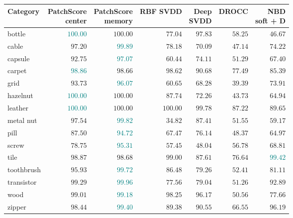 \begin{tabular}{@{}lrrrrrr@{}}
\toprule
\textbf{Category} & \shortstack{PatchScore\\center} & \shortstack{PatchScore\\memory} & RBF SVDD & \shortstack{Deep\\SVDD} & DROCC & \shortstack{NBD\\soft + D}\\
\midrule
bottle & \textcolor{teal}{$100.00$} & $100.00$ & $77.04$ & $97.83$ & $58.25$ & $46.67$\\
cable & $97.20$ & \textcolor{teal}{$99.89$} & $78.18$ & $70.09$ & $47.14$ & $74.22$\\
capsule & $92.75$ & \textcolor{teal}{$97.07$} & $60.44$ & $74.11$ & $51.29$ & $67.40$\\
carpet & \textcolor{teal}{$98.86$} & $98.66$ & $98.62$ & $90.68$ & $77.49$ & $85.39$\\
grid & $93.73$ & \textcolor{teal}{$96.07$} & $60.65$ & $68.28$ & $39.39$ & $73.91$\\
hazelnut & \textcolor{teal}{$100.00$} & $100.00$ & $87.74$ & $72.26$ & $43.73$ & $64.94$\\
leather & \textcolor{teal}{$100.00$} & $100.00$ & $100.00$ & $99.78$ & $87.22$ & $89.65$\\
metal nut & $97.54$ & \textcolor{teal}{$99.82$} & $34.82$ & $87.41$ & $51.55$ & $59.17$\\
pill & $87.50$ & \textcolor{teal}{$94.72$} & $67.47$ & $76.14$ & $48.37$ & $64.97$\\
screw & $78.75$ & \textcolor{teal}{$95.31$} & $57.45$ & $48.04$ & $56.78$ & $68.81$\\
tile & $98.87$ & $98.68$ & $99.00$ & $87.61$ & $76.64$ & \textcolor{teal}{$99.42$}\\
toothbrush & $95.93$ & \textcolor{teal}{$99.72$} & $86.48$ & $79.26$ & $52.41$ & $81.11$\\
transistor & $99.29$ & \textcolor{teal}{$99.96$} & $77.56$ & $79.04$ & $51.26$ & $92.89$\\
wood & $99.01$ & \textcolor{teal}{$99.18$} & $98.25$ & $96.17$ & $50.56$ & $77.66$\\
zipper & $98.44$ & \textcolor{teal}{$99.40$} & $89.38$ & $90.55$ & $66.55$ & $96.19$\\
\bottomrule
\end{tabular}
